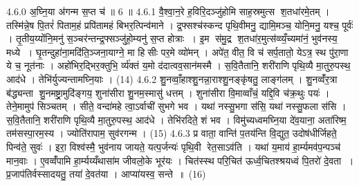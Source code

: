 4.6.0
अ॒घ्नि॒या अ॑गन्म स॒प्त च॑ ॥ 6 ॥
4.6.1
वै॒श्वा॒न॒रे ह॒विरि॒दञ्जु॑होमि साह॒स्रमुत्स श॒तधा॑रमे॒तम् । तस्मि॑न्ने॒ष पि॒तरं॑ पिताम॒हं प्रपि॑तामहं बिभर॒त्पिन्व॑माने । द्र॒फ्सश्च॑स्कन्द पृथि॒वीमनु॒ द्यामि॒मञ्च॒ योनि॒मनु॒ यश्च॒ पूर्वः॑ । तृ॒तीय॒य्योंनि॒मनु॑ स॒ञ्चर॑न्तन्द्र॒फ्सञ्जु॑हो॒म्यनु॑ स॒प्त होत्राः । इ॒म स॑मु॒द्र श॒तधा॑र॒मुत्स॑व्व्यँ॒च्यमा॑नं॒ भुव॑नस्य॒ मध्ये । घृ॒तन्दुहा॑ना॒मदि॑ति॒ञ्जना॒याग्ने॒ मा हिसीः पर॒मे व्यो॑मन् । अपे॑त॒ वीत॒ वि च॑ सर्प॒तातो॒ येऽत्र॒ स्थ पु॑रा॒णा ये च॒ नूत॑नाः । अहो॑भिर॒द्भिर॒क्तुभि॒ र्व्य॑क्तं य॒मो द॑दात्वव॒सान॑मस्मै । स॒वि॒तैतानि॒ शरी॑राणि पृथि॒व्यै मा॒तुरु॒पस्थ॒ आद॑धे । तेभि॑र्युज्यन्तामघ्नि॒याः । (14)
4.6.2
शु॒नव्वाँ॒हाश्शु॒नन्ना॒राश्शु॒नङ्कृ॑षतु॒ लाङ्ग॑लम् । शु॒नव्वँ॑र॒त्रा ब॑द्ध्यन्ता शु॒नमष्ट्रा॒मुदि॑ङ्गय॒ शुना॑सीरा शु॒नम॒स्मासु॑ धत्तम् । शुना॑सीरा वि॒माव्वाँचं॒ यद्दि॒वि च॑क्र॒थुः पयः॑ । तेने॒मामुप॑ सिञ्चतम् । सीते॒ वन्दा॑महे त्वा॒ऽर्वाची॑ सुभगे भव । यथा॑ नस्सु॒भगा स॑सि॒ यथा॑ नस्सु॒फला स॑सि । स॒वि॒तैतानि॒ शरी॑राणि पृथि॒व्यै मा॒तुरु॒पस्थ॒ आद॑धे । तेभि॑रदिते॒ शं भव । विमु॑च्यध्वमघ्नि॒या दे॑व॒याना॒ अता॑रिष्म॒ तम॑सस्पा॒रम॒स्य । ज्योति॑रापाम॒ सुव॑रगन्म । (15)
4.6.3
प्र वाता॒ वान्ति॑ प॒तय॑न्ति वि॒द्युत॒ उदोष॑धीर्जिहते॒ पिन्व॑ते॒ सुवः॑ । इरा॒ विश्व॑स्मै॒ भुव॑नाय जायते॒ यत्प॒र्जन्यः॑ पृथि॒वी रेत॒साऽव॑ति । यथा॑ य॒माय॑ हा॒र्म्यमव॑प॒न्पञ्च॑ मान॒वाः । ए॒वव्वँ॑पामि हा॒र्म्यय्यँथासा॑म जीवलो॒के भूर॑यः । चित॑स्स्थ परि॒चित॑ ऊर्ध्व॒चितश्श्रयध्वं पि॒तरो॑ दे॒वता । प्र॒जाप॑तिर्वस्सादयतु॒ तया॑ दे॒वत॑या । आप्या॑यस्व॒ सन्ते ॥ (16)
\anuvakamend

